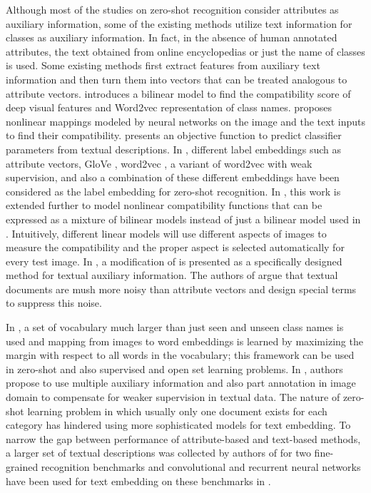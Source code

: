 \documentclass[10pt,twocolumn,letterpaper]{article}
\begin{document}
 Although most of the studies on zero-shot recognition consider attributes as auxiliary information, some of the existing methods utilize text information for classes as auxiliary information. In fact, in the absence of human annotated attributes, the text obtained from online encyclopedias or just the name of classes is used. Some existing methods first extract features from auxiliary text information and then turn them into vectors that can be treated analogous to attribute vectors.
 \cite{devise} introduces a bilinear model to find the compatibility score of deep visual features and Word2vec \cite{word2vec} representation of class names. \cite{ba2015} proposes nonlinear mappings modeled by neural networks on the image and the text inputs to find their compatibility.
  \cite{mohamed13} presents an objective function to predict classifier parameters from textual descriptions. In \cite{Akata2015}, different label embeddings such as attribute vectors, GloVe \cite{pennington2014glove}, word2vec \cite{word2vec}, a variant of word2vec with weak supervision, and also a combination of these different embeddings have been considered as the label embedding for zero-shot recognition. In \cite{Xian2016}, this work is extended further to model nonlinear compatibility functions that can be expressed as a mixture of bilinear models instead of just a bilinear model used in \cite{Akata2015}. Intuitively, different linear models will use different aspects of images to measure the compatibility and the proper aspect is selected automatically for every test image.
  In \cite{Qiao2016}, a modification of \cite{emb15} is presented as a specifically designed method for textual auxiliary information. The authors of \cite{Qiao2016}
  argue that textual documents are mush more noisy than attribute vectors and design special terms to suppress this noise.

In \cite{Fu2016}, a set of vocabulary much larger than just seen and unseen class names is used and mapping from images to word embeddings is learned
by  maximizing the margin with respect to all words in the vocabulary; this framework can be used in zero-shot and also supervised and open set learning problems.
In  \cite{Akata2016}, authors propose to use multiple auxiliary information and also  part annotation in image domain to compensate for weaker supervision in textual data.
The nature of zero-shot learning problem in which usually only one document exists for each category has hindered using more sophisticated models for text embedding.
To narrow the gap between performance of attribute-based and text-based methods, a larger set of textual descriptions was collected
by authors of \cite{Akata2016rnn} for two fine-grained recognition benchmarks and convolutional and recurrent neural networks have been used for text embedding on these benchmarks in \cite{Akata2016rnn}.
\end{document}
